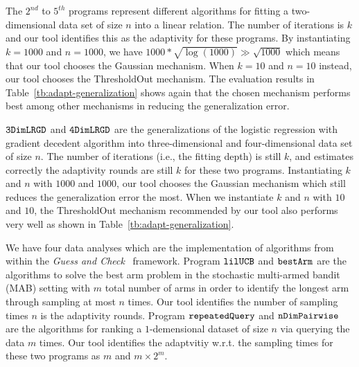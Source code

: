 The $2^{nd}$ to $5^{th}$ programs represent different algorithms for fitting a two-dimensional data set of size $n$ into a linear relation.
The number of iterations is $k$ and our tool identifies this as the  adaptivity  for these programs.
By instantiating $k = 1000$ and $n = 1000$, we have
$1000* \sqrt{\log(1000)} \gg \sqrt{1000}$ which means that our tool chooses the Gaussian mechanism. When $k=10$ and $n=10$ instead, our tool chooses the ThresholdOut mechanism. 
The evaluation results in Table~\ref{tb:adapt-generalization} shows again that the chosen mechanism performs best among other mechanisms in reducing the generalization error.

$  \mathtt{ 3DimLRGD }$ and $  \mathtt{ 4DimLRGD }$ are the generalizations of the logistic regression with gradient decedent
algorithm into three-dimensional and four-dimensional data set of size $n$.
The number of iterations (i.e., the fitting depth) is still $k$, and {\THESYSTEM} estimates correctly the adaptivity rounds are still $k$ for these two programs.
Instantiating $k$ and $n$ with $1000$ and $1000$,
our tool chooses the Gaussian mechanism which still reduces the generalization error the most. When we instantiate $k$ and $n$ with $10$ and $10$, the ThresholdOut mechanism recommended by our tool also performs very well as shown in Table~\ref{tb:adapt-generalization}. 

We have four data analyses which are the implementation of algorithms from~\cite{Jamieson2015TheAO} within the \emph{Guess and Check}~\cite{RogersRSSTW20} framework.
Program $\mathtt{lilUCB}$ and $\mathtt{bestArm}$ are the algorithms to solve the best arm problem in the stochastic multi-armed bandit (MAB) setting
with $m$ total number of arms in order to identify the longest arm through sampling at most $n$ times.
Our tool identifies the number of sampling times $n$ is the adaptivity rounds.
Program $\mathtt{repeatedQuery}$ and $\mathtt{nDimPairwise}$ are the algorithms for ranking
a $1$-demensional dataset of size $n$ via querying the data $m$ times.
Our tool identifies the adaptvitiy w.r.t. the sampling times for these two programs as $m$ and $m \times 2^m$.

